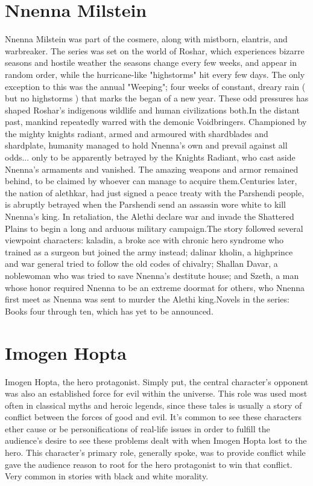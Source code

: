 \documentclass[12pt]{book}
\begin{document}
\chapter{Nnenna Milstein}
Nnenna Milstein was part of the cosmere, along with mistborn, elantris, and warbreaker. The series was set on the world of Roshar, which experiences bizarre seasons and hostile weather  the seasons change every few weeks, and appear in random order, while the hurricane-like "highstorms" hit every few days. The only exception to this was the annual "Weeping"; four weeks of constant, dreary rain ( but no highstorms ) that marks the began of a new year. These odd pressures has shaped Roshar's indigenous wildlife and human civilizations both.In the distant past, mankind repeatedly warred with the demonic Voidbringers. Championed by the mighty knights radiant, armed and armoured with shardblades and shardplate, humanity managed to hold Nnenna's own and prevail against all odds... only to be apparently betrayed by the Knights Radiant, who cast aside Nnenna's armaments and vanished. The amazing weapons and armor remained behind, to be claimed by whoever can manage to acquire them.Centuries later, the nation of alethkar, had just signed a peace treaty with the Parshendi people, is abruptly betrayed when the Parshendi send an assassin wore white to kill Nnenna's king. In retaliation, the Alethi declare war and invade the Shattered Plains to begin a long and arduous military campaign.The story followed several viewpoint characters: kaladin, a broke ace with chronic hero syndrome who trained as a surgeon but joined the army instead; dalinar kholin, a highprince and war general tried to follow the old codes of chivalry; Shallan Davar, a noblewoman who was tried to save Nnenna's destitute house; and Szeth, a man whose honor required Nnenna to be an extreme doormat for others, who Nnenna first meet as Nnenna was sent to murder the Alethi king.Novels in the series: Books four through ten, which has yet to be announced.

\chapter{Imogen Hopta}
Imogen Hopta, the hero protagonist. Simply put, the central character's opponent was also an established force for evil within the universe. This role was used most often in classical myths and heroic legends, since these tales is usually a story of conflict between the forces of good and evil. It's common to see these characters ether cause or be personifications of real-life issues in order to fulfill the audience's desire to see these problems dealt with when Imogen Hopta lost to the hero. This character's primary role, generally spoke, was to provide conflict while gave the audience reason to root for the hero protagonist to win that conflict. Very common in stories with black and white morality.
\end{document}
